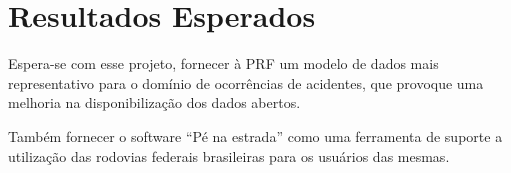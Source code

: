 \section{Resultados Esperados}

Espera-se com esse projeto, fornecer à PRF um modelo de dados mais representativo
para o domínio de ocorrências de acidentes, que provoque uma melhoria na
disponibilização dos dados abertos.

Também fornecer o software “Pé na estrada” como uma ferramenta de suporte a
utilização das rodovias federais brasileiras para os usuários das mesmas.